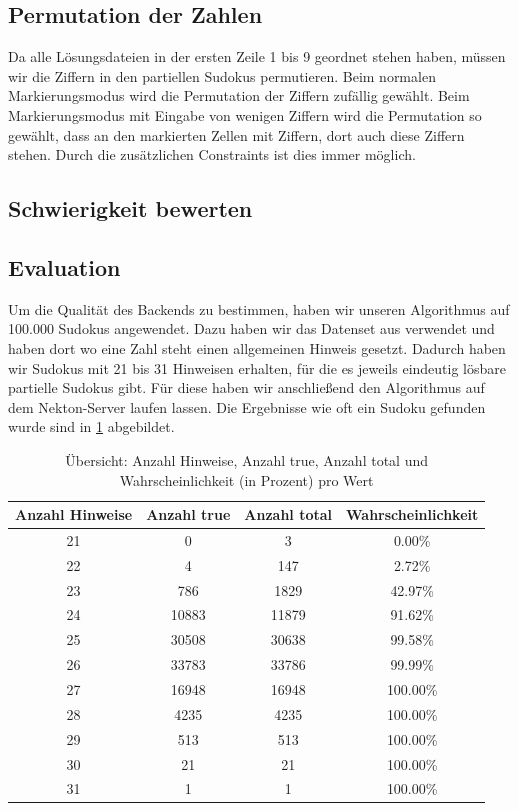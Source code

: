 \subsection{Permutation der Zahlen}
Da alle Lösungsdateien in der ersten Zeile 1 bis 9 geordnet stehen haben, müssen wir die Ziffern in den partiellen Sudokus permutieren.
Beim normalen Markierungsmodus wird die Permutation der Ziffern zufällig gewählt.
Beim Markierungsmodus mit Eingabe von wenigen Ziffern wird die Permutation so gewählt, dass an den markierten Zellen mit Ziffern,
dort auch diese Ziffern stehen.
Durch die zusätzlichen Constraints ist dies immer möglich.


\subsection{Schwierigkeit bewerten}


\subsection{Evaluation}
Um die Qualität des Backends zu bestimmen, haben wir unseren Algorithmus auf 100.000 Sudokus angewendet.
Dazu haben wir das Datenset aus \cite{tdoku_data_zip} verwendet und haben dort wo eine Zahl steht einen allgemeinen Hinweis gesetzt.
Dadurch haben wir Sudokus mit 21 bis 31 Hinweisen erhalten, für die es jeweils eindeutig lösbare partielle Sudokus gibt.
Für diese haben wir anschließend den Algorithmus auf dem Nekton-Server laufen lassen.
Die Ergebnisse wie oft ein Sudoku gefunden wurde sind in \cref{tab:ergebnisse} abgebildet.

\begin{table}[H]
    \centering
    \begin{tabular}{|c|c|c|c|}
        \hline
        \textbf{Anzahl Hinweise} & \textbf{Anzahl true} & \textbf{Anzahl total} & \textbf{Wahrscheinlichkeit} \\
        \hline
        21 & 0     & 3     & 0.00\% \\
        22 & 4     & 147   & 2.72\% \\
        23 & 786   & 1829  & 42.97\% \\
        24 & 10883 & 11879 & 91.62\% \\
        25 & 30508 & 30638 & 99.58\% \\
        26 & 33783 & 33786 & 99.99\% \\
        27 & 16948 & 16948 & 100.00\% \\
        28 & 4235  & 4235  & 100.00\% \\
        29 & 513   & 513   & 100.00\% \\
        30 & 21    & 21    & 100.00\% \\
        31 & 1     & 1     & 100.00\% \\
        \hline
    \end{tabular}
    \caption{Übersicht: Anzahl Hinweise, Anzahl true, Anzahl total und Wahrscheinlichkeit (in Prozent) pro Wert}
    \label{tab:ergebnisse}
\end{table}

